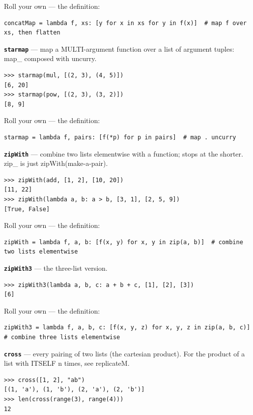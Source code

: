 \documentclass[10pt,letterpaper]{article}
\begin{document}
Roll your own --- the definition:

\begin{lstlisting}[style=ex]
concatMap = lambda f, xs: [y for x in xs for y in f(x)]  # map f over xs, then flatten
\end{lstlisting}
\textbf{\texttt{starmap}} --- map a MULTI-argument function over a list of argument tuples: map\_ composed with uncurry.
\begin{lstlisting}[style=ex]
>>> starmap(mul, [(2, 3), (4, 5)])
[6, 20]
>>> starmap(pow, [(2, 3), (3, 2)])
[8, 9]
\end{lstlisting}

Roll your own --- the definition:

\begin{lstlisting}[style=ex]
starmap = lambda f, pairs: [f(*p) for p in pairs]  # map . uncurry
\end{lstlisting}
\textbf{\texttt{zipWith}} --- combine two lists elementwise with a function; stops at the shorter. zip\_ is just zipWith(make-a-pair).
\begin{lstlisting}[style=ex]
>>> zipWith(add, [1, 2], [10, 20])
[11, 22]
>>> zipWith(lambda a, b: a > b, [3, 1], [2, 5, 9])
[True, False]
\end{lstlisting}

Roll your own --- the definition:

\begin{lstlisting}[style=ex]
zipWith = lambda f, a, b: [f(x, y) for x, y in zip(a, b)]  # combine two lists elementwise
\end{lstlisting}
\textbf{\texttt{zipWith3}} --- the three-list version.
\begin{lstlisting}[style=ex]
>>> zipWith3(lambda a, b, c: a + b + c, [1], [2], [3])
[6]
\end{lstlisting}

Roll your own --- the definition:

\begin{lstlisting}[style=ex]
zipWith3 = lambda f, a, b, c: [f(x, y, z) for x, y, z in zip(a, b, c)]  # combine three lists elementwise
\end{lstlisting}
\textbf{\texttt{cross}} --- every pairing of two lists (the cartesian product). For the product of a list with ITSELF n times, see replicateM.
\begin{lstlisting}[style=ex]
>>> cross([1, 2], "ab")
[(1, 'a'), (1, 'b'), (2, 'a'), (2, 'b')]
>>> len(cross(range(3), range(4)))
12
\end{lstlisting}
\end{document}
